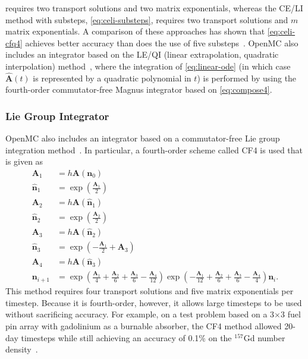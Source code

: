\documentclass[3p,authoryear]{elsarticle}
\newcommand{\vect}[1]{\mathbf{#1}} %
\begin{document}
 requires two transport solutions and two matrix
exponentials, whereas the CE/LI method with substeps, \cref{eq:celi-substeps},
requires two transport solutions and $m$ matrix exponentials. A comparison of
these approaches has shown that \cref{eq:celi-cfq4} achieves better accuracy
than does the use of five substeps~\citep{josey2017phd}. OpenMC also includes an
integrator based on the LE/QI (linear extrapolation, quadratic interpolation)
method~\citep{isotalo2011ane2}, where the integration of \cref{eq:linear-ode}
(in which case $\hat{\vect{A}}(t)$ is represented by a quadratic polynomial in
$t$) is performed by using the fourth-order commutator-free Magnus integrator
based on \cref{eq:compose4}.

\subsubsection{Lie Group Integrator}

OpenMC also includes an integrator based on a commutator-free Lie group
integration method~\citep{celledoni2004fgcs}. In particular, a fourth-order
scheme called CF4 is used that is given as
\begin{equation}
  \begin{split}
    \vect{A}_1 &= h\vect{A}(\vect{n}_0) \\
    \hat{\vect{n}}_1 &= \exp \left ( \frac{\vect{A}_1}{2} \right ) \\
    \vect{A}_2 &= h\vect{A}(\hat{\vect{n}}_1) \\
    \hat{\vect{n}}_2 &= \exp \left ( \frac{\vect{A}_2}{2} \right ) \\
    \vect{A}_3 &= h \vect{A}(\hat{\vect{n}}_2) \\
    \hat{\vect{n}}_3 &= \exp \left ( -\frac{\vect{A}_1}{2}  + \vect{A}_3 \right ) \\
    \vect{A}_4 &= h\vect{A}(\hat{\vect{n}}_3) \\
    \vect{n}_{i+1} &= \exp \left ( \frac{\vect{A}_1}{4} + \frac{\vect{A}_2}{6} + \frac{\vect{A}_3}{6} - \frac{\vect{A}_4}{12} \right )
    \exp \left ( -\frac{\vect{A}_1}{12} + \frac{\vect{A}_2}{6} + \frac{\vect{A}_3}{6} - \frac{\vect{A}_4}{4} \right ) \vect{n}_i.
  \end{split}
\end{equation}
This method requires four transport solutions and five matrix exponentials per
timestep. Because it is fourth-order, however, it allows large timesteps to be
used without sacrificing accuracy. For example, on a test problem based on a
3$\times$3 fuel pin array with gadolinium as a burnable absorber, the CF4 method
allowed 20-day timesteps while still achieving an accuracy of 0.1\% on the
$^{157}$Gd number density~\citep{josey2017phd}.
\end{document}

